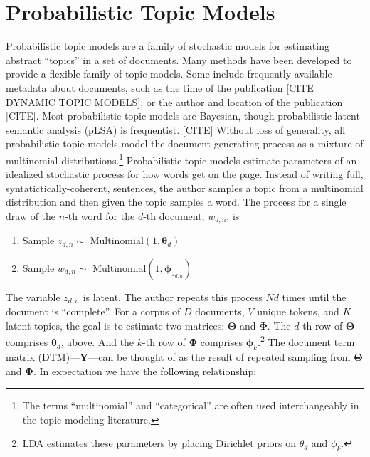 \documentclass[conference,final,]{IEEEtran}
\providecommand{\tightlist}{%
  \setlength{\itemsep}{0pt}\setlength{\parskip}{0pt}}
\begin{document}
\hypertarget{probabilistic-topic-models}{%
\section{Probabilistic Topic Models}\label{probabilistic-topic-models}}

Probabilistic topic models are a family of stochastic models for
estimating abstract ``topics'' in a set of documents. Many methods have
been developed to provide a flexible family of topic models. Some
include frequently available metadata about documents, such as the time
of the publication {[}CITE DYNAMIC TOPIC MODELS{]}, or the author and
location of the publication {[}CITE{]}. Most probabilistic topic models
are Bayesian, though probabilistic latent semantic analysis (pLSA) is
frequentist. {[}CITE{]} Without loss of generality, all probabilistic
topic models model the document-generating process as a mixture of
multinomial distributions.\footnote{The terms ``multinomial'' and
  ``categorical'' are often used interchangeably in the topic modeling
  literature.} Probabilistic topic models estimate parameters of an
idealized stochastic process for how words get on the page. Instead of
writing full, syntatictically-coherent, sentences, the author samples a
topic from a multinomial distribution and then given the topic samples a
word. The process for a single draw of the \(n\)-th word for the
\(d\)-th document, \(w_{d,n}\), is

\begin{enumerate}
\def\labelenumi{\arabic{enumi}.}
\tightlist
\item
  Sample \(z_{d,n}\sim\) \(\text{Multinomial}(1,\boldsymbol\theta_d)\)
\item
  Sample \(w_{d,n}\sim\)
  \(\text{Multinomial}(1,\boldsymbol\phi_{z_{d,n}})\)
\end{enumerate}

The variable \(z_{d,n}\) is latent. The author repeats this process
\(Nd\) times until the document is ``complete''. For a corpus of \(D\)
documents, \(V\) unique tokens, and \(K\) latent topics, the goal is to
estimate two matrices: \(\boldsymbol\Theta\) and \(\boldsymbol\Phi\).
The \(d\)-th row of \(\boldsymbol\Theta\) comprises
\(\boldsymbol\theta_d\), above. And the \(k\)-th row of
\(\boldsymbol\Phi\) comprises \(\boldsymbol\phi_k\).\footnote{LDA
  estimates these parameters by placing Dirichlet priors on \(\theta_d\)
  and \(\phi_k\).} The document term matrix (DTM)---\(\mathbf{Y}\)---can
be thought of as the result of repeated sampling from
\(\boldsymbol\Theta\) and \(\boldsymbol\Phi\). In expectation we have
the following relationship:
\end{document}
